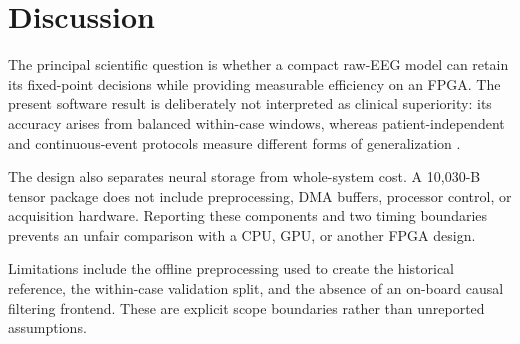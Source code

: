 \section{Discussion}

The principal scientific question is whether a compact raw-EEG model can retain
its fixed-point decisions while providing measurable efficiency on an FPGA.
The present software result is deliberately not interpreted as clinical
superiority: its accuracy arises from balanced within-case windows, whereas
patient-independent and continuous-event protocols measure different forms of
generalization \cite{ali2024,gu2026}.

The design also separates neural storage from whole-system cost. A 10,030-B
tensor package does not include preprocessing, DMA buffers, processor control,
or acquisition hardware. Reporting these components and two timing boundaries
prevents an unfair comparison with a CPU, GPU, or another FPGA design.


Limitations include the offline preprocessing used to create the historical
reference, the within-case validation split, and the absence of an on-board
causal filtering frontend. These are explicit scope boundaries rather than
unreported assumptions.
